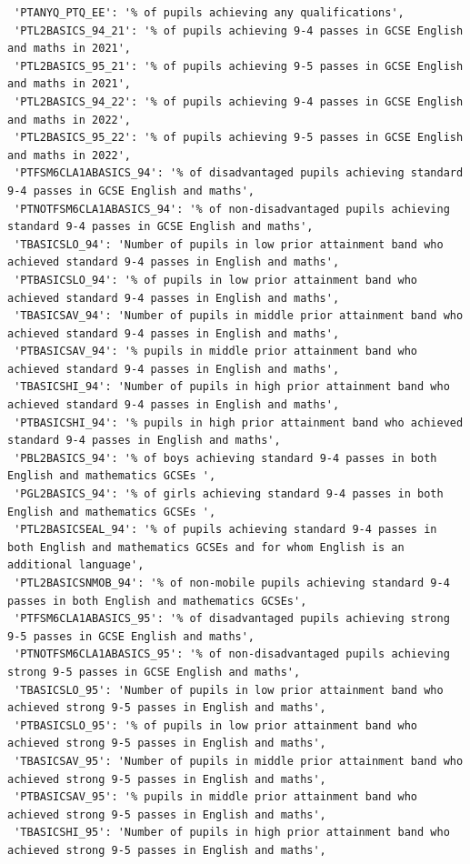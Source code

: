 \documentclass[
  letterpaper,
  DIV=11,
  numbers=noendperiod]{scrartcl}
\begin{document}
\begin{verbatim}
 'PTANYQ_PTQ_EE': '% of pupils achieving any qualifications',
 'PTL2BASICS_94_21': '% of pupils achieving 9-4 passes in GCSE English and maths in 2021',
 'PTL2BASICS_95_21': '% of pupils achieving 9-5 passes in GCSE English and maths in 2021',
 'PTL2BASICS_94_22': '% of pupils achieving 9-4 passes in GCSE English and maths in 2022',
 'PTL2BASICS_95_22': '% of pupils achieving 9-5 passes in GCSE English and maths in 2022',
 'PTFSM6CLA1ABASICS_94': '% of disadvantaged pupils achieving standard 9-4 passes in GCSE English and maths',
 'PTNOTFSM6CLA1ABASICS_94': '% of non-disadvantaged pupils achieving standard 9-4 passes in GCSE English and maths',
 'TBASICSLO_94': 'Number of pupils in low prior attainment band who achieved standard 9-4 passes in English and maths',
 'PTBASICSLO_94': '% of pupils in low prior attainment band who achieved standard 9-4 passes in English and maths',
 'TBASICSAV_94': 'Number of pupils in middle prior attainment band who achieved standard 9-4 passes in English and maths',
 'PTBASICSAV_94': '% pupils in middle prior attainment band who achieved standard 9-4 passes in English and maths',
 'TBASICSHI_94': 'Number of pupils in high prior attainment band who achieved standard 9-4 passes in English and maths',
 'PTBASICSHI_94': '% pupils in high prior attainment band who achieved standard 9-4 passes in English and maths',
 'PBL2BASICS_94': '% of boys achieving standard 9-4 passes in both English and mathematics GCSEs ',
 'PGL2BASICS_94': '% of girls achieving standard 9-4 passes in both English and mathematics GCSEs ',
 'PTL2BASICSEAL_94': '% of pupils achieving standard 9-4 passes in both English and mathematics GCSEs and for whom English is an additional language',
 'PTL2BASICSNMOB_94': '% of non-mobile pupils achieving standard 9-4 passes in both English and mathematics GCSEs',
 'PTFSM6CLA1ABASICS_95': '% of disadvantaged pupils achieving strong 9-5 passes in GCSE English and maths',
 'PTNOTFSM6CLA1ABASICS_95': '% of non-disadvantaged pupils achieving strong 9-5 passes in GCSE English and maths',
 'TBASICSLO_95': 'Number of pupils in low prior attainment band who achieved strong 9-5 passes in English and maths',
 'PTBASICSLO_95': '% of pupils in low prior attainment band who achieved strong 9-5 passes in English and maths',
 'TBASICSAV_95': 'Number of pupils in middle prior attainment band who achieved strong 9-5 passes in English and maths',
 'PTBASICSAV_95': '% pupils in middle prior attainment band who achieved strong 9-5 passes in English and maths',
 'TBASICSHI_95': 'Number of pupils in high prior attainment band who achieved strong 9-5 passes in English and maths',

\end{verbatim}
\end{document}
